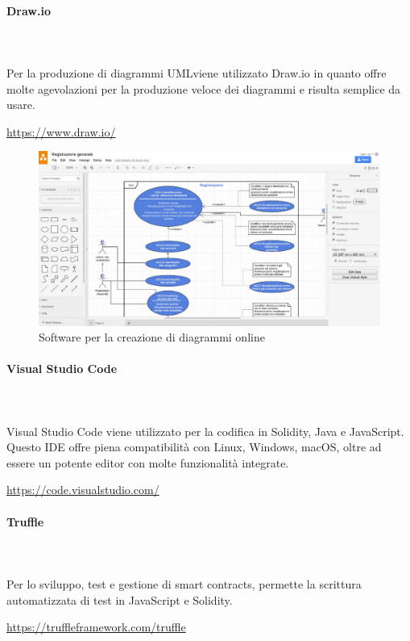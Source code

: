 		\paragraph{Draw.io} \mbox{}\\ \mbox{}\\
		Per la produzione di diagrammi UML\glosp viene utilizzato Draw.io in quanto 
		offre molte agevolazioni per la produzione veloce dei diagrammi e risulta 
		semplice da usare. \newline
		\centerline{\url{https://www.draw.io/}}
			\begin{figure}[H]
				\includegraphics[width=0.99\linewidth]{res/images/drawio.jpg}
				\caption{Software per la creazione di diagrammi online}
			\end{figure} 
				
		\paragraph{Visual Studio Code} \mbox{}\\ \mbox{}\\
		Visual Studio Code viene utilizzato per la codifica in Solidity, Java e JavaScript. Questo 
		IDE offre piena compatibilità con Linux, Windows, macOS, oltre ad essere un 
		potente editor con molte funzionalità integrate. \newline
		\centerline{\url{https://code.visualstudio.com/}}

			
		\paragraph{Truffle} \mbox{}\\ \mbox{}\\
		Per lo sviluppo, test e gestione di smart contracts\glo, permette la scrittura automatizzata di test in JavaScript e Solidity\glo.\newline
		\centerline{\url{https://truffleframework.com/truffle}}
		

